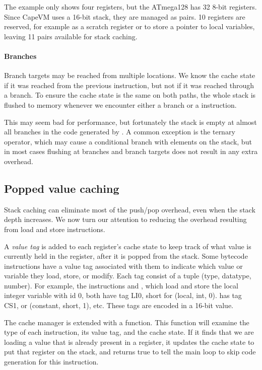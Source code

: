 The example only shows four registers, but the ATmega128 has 32 8-bit registers. Since CapeVM uses a 16-bit stack, they are managed as pairs. 10 registers are reserved, for example as a scratch register or to store a pointer to local variables, leaving 11 pairs available for stack caching.

\paragraph{Branches} Branch targets may be reached from multiple locations. We know the cache state if it was reached from the previous instruction, but not if it was reached through a branch. To ensure the cache state is the same on both paths, the whole stack is flushed to memory whenever we encounter either a branch or a  instruction. 

This may seem bad for performance, but fortunately the stack is empty at almost all branches in the code generated by . A common exception is the ternary  operator, which may cause a conditional branch with elements on the stack, but in most cases flushing at branches and branch targets does not result in any extra overhead.

\subsection{Popped value caching}
\label{sec-optimisations-popped-value-caching}


Stack caching can eliminate most of the push/pop overhead, even when the stack depth increases. We now turn our attention to reducing the overhead resulting from load and store instructions.


A \emph{value tag} is added to each register's cache state to keep track of what value is currently held in the register, after it is popped from the stack. Some bytecode instructions have a value tag associated with them to indicate which value or variable they load, store, or modify. Each tag consist of a tuple (type, datatype, number). For example, the instructions  and , which load and store the local integer variable with id 0, both have tag LI0, short for (local, int, 0).  has tag CS1, or (constant, short, 1), etc. These tags are encoded in a 16-bit value.

The cache manager is extended with a  function. This function will examine the type of each instruction, its value tag, and the cache state. If it finds that we are loading a value that is already present in a register, it updates the cache state to put that register on the stack, and returns true to tell the main loop to skip code generation for this instruction.

